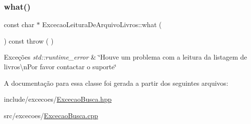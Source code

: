\subsubsection{\texorpdfstring{what()}{what()}}
{\footnotesize\ttfamily const char $\ast$ Excecao\+Leitura\+De\+Arquivo\+Livros\+::what (\begin{DoxyParamCaption}{ }\end{DoxyParamCaption}) const throw ( ) \hspace{0.3cm}{\ttfamily [virtual]}}


\begin{DoxyExceptions}{Exceções}
{\em std\+::runtime\+\_\+error} & \char`\"{}\+Houve um problema com a leitura da listagem de livros\textbackslash{}n\+Por favor contactar o suporte\char`\"{} \\
\hline
\end{DoxyExceptions}


A documentação para essa classe foi gerada a partir dos seguintes arquivos\+:\begin{DoxyCompactItemize}
\item 
include/excecoes/\mbox{\hyperlink{_excecao_busca_8hpp}{Excecao\+Busca.\+hpp}}\item 
src/excecoes/\mbox{\hyperlink{_excecao_busca_8cpp}{Excecao\+Busca.\+cpp}}\end{DoxyCompactItemize}
